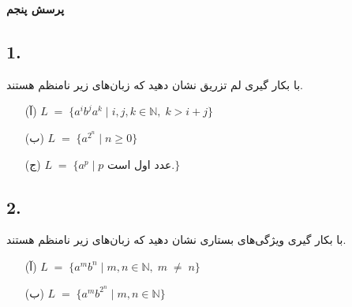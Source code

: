 \textbf{پرسش پنجم}
\subsection*{1. }
با بكار گيری لم تزريق نشان دهيد كه زبان‌های زير نامنظم هستند.
\begin{itemize}
    \item[(آ)]
    $L\;=\;\{a^ib^ja^k\;|\;i,j,k\in\mathbb{N}, \;
    k>i+j\}$
    \item[(ب)]
    $L\;=\;\{a^{2^n}\;|\;n\geq0\}$
    \item[(ج)]
    $L\;=\;\{a^p\;|\; \text{$p$ عدد اول است.}\}$
\end{itemize}

\subsection*{2. }
 با بكار گيری ويژگی‌های بستاری نشان دهيد كه زبان‌های زير نامنظم هستند.
 \begin{itemize}
    \item[(آ)]
    $L\;=\;\{a^mb^n\;|\;m,n\in \mathbb{N},\; m\; \neq \; n\}$
    \item[(ب)]
    $L\;=\;\{a^mb^{2^n}\;|\;m,n\in \mathbb{N}\}$
\end{itemize}